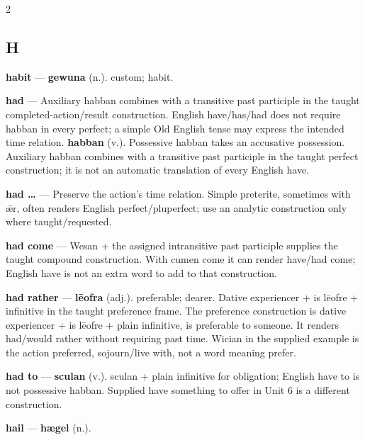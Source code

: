 \begin{multicols}{2}
\subsection*{H}
\textbf{habit} — \textbf{gewuna} (n.). custom; habit.\par
\textbf{had} — Auxiliary habban combines with a transitive past participle in the taught completed-action/result construction. English have/has/had does not require habban in every perfect; a simple Old English tense may express the intended time relation. \textbf{habban} (v.). Possessive habban takes an accusative possession. Auxiliary habban combines with a transitive past participle in the taught perfect construction; it is not an automatic translation of every English have.\par
\textbf{had …} — Preserve the action's time relation. Simple preterite, sometimes with ǣr, often renders English perfect/pluperfect; use an analytic construction only where taught/requested.\par
\textbf{had come} — Wesan + the assigned intransitive past participle supplies the taught compound construction. With cumen come it can render have/had come; English have is not an extra word to add to that construction.\par
\textbf{had rather} — \textbf{lēofra} (adj.). preferable; dearer. Dative experiencer + is lēofre + infinitive in the taught preference frame. The preference construction is dative experiencer + is lēofre + plain infinitive, is preferable to someone. It renders had/would rather without requiring past time. Wician in the supplied example is the action preferred, sojourn/live with, not a word meaning prefer.\par
\textbf{had to} — \textbf{sculan} (v.). sculan + plain infinitive for obligation; English have to is not possessive habban. Supplied have something to offer in Unit 6 is a different construction.\par
\textbf{hail} — \textbf{hægel} (n.).\par

\end{multicols}
